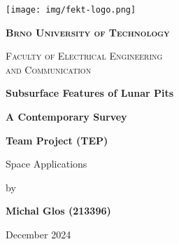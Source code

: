 \begin{titlepage}
    \centering
    \vspace{3cm}
    \texttt{[image: img/fekt-logo.png]} \\
    \vspace{0.5cm}
    
    {\scshape\large\bfseries Brno University of Technology \par}
    {\scshape\normalsize Faculty of Electrical Engineering \\ and Communication \par}
    \vspace{3.33cm}
    
    {\Huge\bfseries Subsurface Features of Lunar Pits} \\ 
    {\Large\bfseries\vspace{0.5cm} A Contemporary Survey \par}
    \vspace{2.66cm}

    {\LARGE\bfseries Team Project (TEP)} \\
    {\Large Space Applications\par}
    \vspace{3.33cm}
    
    {\Large by \par}
    {\Large\bfseries Michal Glos (213396) \par}
    \vfill

    
    {\large December 2024 \par}
\end{titlepage}
